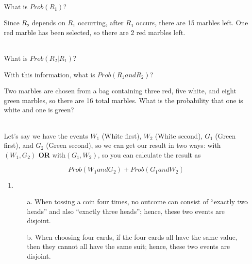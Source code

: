{\begin{questionNOGRADE}{\thequestion}
        ~\\
        What is $Prob(R_{1})$? ~\\ \vspace{1cm}

        Since $R_{2}$ depends on $R_{1}$ occurring, after $R_{1}$
        occurs, there are 15 marbles left. One red marble
        has been selected, so there are 2 red marbles left.

        ~\\
        What is $Prob(R_{2} | R_{1})$? ~\\ \vspace{1cm}

        With this information, what is $Prob(R_{1} and R_{2})$?
    \end{questionNOGRADE}

    \newpage

    \begin{questionNOGRADE}{\thequestion}
            Two marbles are chosen from a bag containing three red, five white, and eight green marbles,
            so there are 16 total marbles.
            What is the probability that one is white and one is green?

            ~\\
            Let's say we have the events
            $W_{1}$ (White first), $W_{2}$ (White second), $G_{1}$ (Green first), and
            $G_{2}$ (Green second), so we can get our result in two ways: with
            $(W_{1}, G_{2})$ \textbf{OR} with$(G_{1}, W_{2})$, so you can calculate
            the result as

            $$Prob(W_{1} and G_{2}) + Prob(G_{1} and W_{2})$$
    \end{questionNOGRADE}

}{

    \begin{enumerate}
        \item
            \begin{itemize}
                \item[a.]   When tossing a coin four times, no outcome can
                            consist of ``exactly two heads'' and also ``exactly three heads'';
                            hence, these two events are disjoint.
                            
                \item[b.]   When choosing four cards, if the four cards all have
                            the same value, then they cannot all have the same suit; hence, these
                            two events are disjoint.
                            

\end{itemize}
\end{enumerate}}

